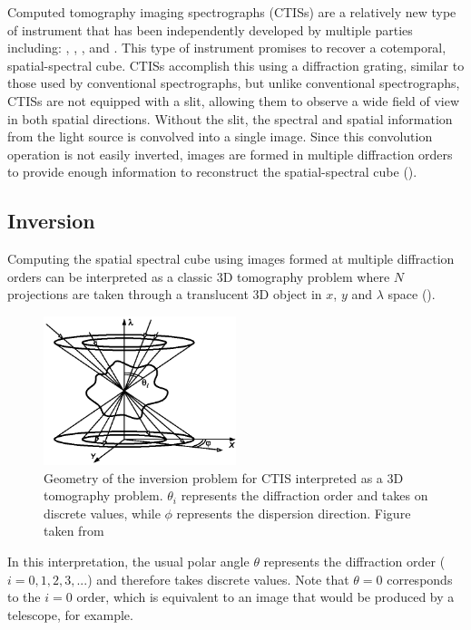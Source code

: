 \documentclass{article}
\begin{document}
			Computed tomography imaging spectrographs (CTISs) are a relatively new type of instrument that has been independently developed by multiple parties including: \cite{Okamoto:91}, \cite{bulygin:92}, \cite{Descour:95}, and \cite{kankel1}. This type of instrument promises to recover a cotemporal, spatial-spectral cube. CTISs accomplish this using a diffraction grating, similar to those used by conventional spectrographs, but unlike conventional spectrographs, CTISs are not equipped with a slit, allowing them to observe a wide field of view in both spatial directions. Without the slit, the spectral and spatial information from the light source is convolved into a single image. Since this convolution operation is not easily inverted, images are formed in multiple diffraction orders to provide enough information to reconstruct the spatial-spectral cube (\cite{inversion}).	
			 
		\subsection{Inversion}
		
			Computing the spatial spectral cube using images formed at multiple diffraction orders can be interpreted as a classic 3D tomography problem where $N$ projections are taken through a translucent 3D object in $x$, $y$ and $\lambda$ space (\cite{Bulygin:05}).
			\begin{figure}[h!]
				\centering
				\includegraphics[width=0.5\textwidth]{figures/tomography}
				\caption{Geometry of the inversion problem for CTIS interpreted as a 3D tomography problem. $\theta_i$ represents the diffraction order and takes on discrete values, while $\phi$ represents the dispersion direction. Figure taken from \cite{Bulygin:05}}
				\label{tomography}
			\end{figure}
			In this interpretation, the usual polar angle $\theta$ represents the diffraction order ($i=0,1,2,3,...$) and therefore takes discrete values. Note that $\theta=0$ corresponds to the $i=0$ order, which is equivalent to an image that would be produced by a telescope, for example.
			
\end{document}
